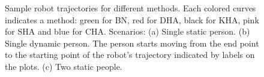 \begin{figure}[t!]
\centering
{}%
%
%

\caption{Sample robot trajectories for different methods. Each colored curves indicates a method: green for BN, red for DHA, black for KHA, pink for SHA and blue for CHA. Scenarios: (a) Single static person. (b) Single dynamic person. The person starts moving from the end point to the starting point of the robot's trajectory indicated by labels on the plots. (c) Two static people.}
\label{fig:trajs}
\end{figure}



